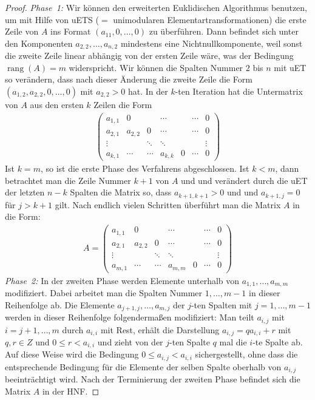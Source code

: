 \documentclass[
a4paper,12pt,
bibliography=totocnumbered,
numbers=noenddot,
]{scrartcl}
\numberwithin{equation}{subsection}
\newcommand{\rang}{\operatorname{rang}} %
\theoremstyle{plain}
\theoremstyle{definition}
\begin{document}
\begin{proof}
	\emph{Phase~1:} Wir können den erweiterten Euklidischen Algorithmus benutzen, um mit Hilfe von uETS ($=$ unimodularen Elementartransformationen) die erste Zeile von $A$ ins Format $(a_{11}, 0,\ldots, 0)$ zu überführen. 
	Dann befindet sich unter den Komponenten $a_{2,2},\ldots,a_{n,2}$ mindestens eine Nichtnullkomponente, weil sonst die zweite Zeile linear abhängig von der ersten Zeile wäre, was der Bedingung $\rang(A) = m$ widerspricht. Wir können die Spalten Nummer $2$ bis $n$ mit uET so verändern, dass nach dieser Änderung die zweite Zeile die Form $(a_{1,2},a_{2,2},0,\ldots,0)$ mit $a_{2,2}  >0$ hat. In der $k$-ten Iteration hat die Untermatrix von  $A$ aus den ersten $k$  Zeilen die Form 
	\begin{align*}
			\begin{pmatrix*}
					a_{1,1} & 0 &   & \cdots & & \cdots & 0 
\\					a_{2,1} & a_{2,2} & 0 & \cdots & & \cdots & 0 
\\ \vdots  & & \ddots & \ddots &  & & \vdots 
\\ a_{k,1} & \cdots & \cdots & a_{k,k} &  0 & \cdots & 0 
			\end{pmatrix*} 
	\end{align*} 
	Ist $k=m$, so ist die erste Phase des Verfahrens abgeschlossen. Ist $k<m$, dann betrachtet man die Zeile Nummer $k+1$ von $A$ und und verändert durch die uET der letzten $n-k$ Spalten die Matrix so, dass $a_{k+1,k+1}>0$ und und $a_{k+1,j} =0$ für $j> k+1$ gilt. Nach endlich vielen Schritten überführt man die Matrix $A$ in die Form: 
	\begin{align*}
		A=
	\begin{pmatrix*}
		a_{1,1} & 0 &   & \cdots & & \cdots & 0 
		\\					a_{2,1} & a_{2,2} & 0 & \cdots & & \cdots & 0 
		\\ \vdots  & & \ddots & \ddots &  & & \vdots 
		\\ a_{m,1} & \cdots & \cdots & a_{m,m} &  0 & \cdots & 0 
	\end{pmatrix*} 
\end{align*} 
	\emph{Phase~2:} In der zweiten Phase werden Elemente unterhalb von $a_{1,1},\ldots, a_{m,m}$ modifiziert. Dabei  arbeitet man die Spalten Nummer $1,\ldots,m-1$ in dieser Reihenfolge ab. Die Elemente $a_{j+1,j},\ldots, a_{m,j}$ der $j$-ten Spalten mit $j=1,\ldots, m-1$ werden in dieser Reihenfolge folgendermaßen modifiziert: Man teilt $a_{i,j}$ mit $i=j+1,\ldots,m$ durch $a_{i,i}$ mit Rest, erhält die Darstellung $a_{i,j} = q a_{i,i} + r$ mit $q,r \in Z$ und $0 \le r < a_{i,i}$ und zieht von der $j$-ten Spalte $q$ mal die $i$-te Spalte ab. Auf diese Weise wird die Bedingung $0 \le a_{i,j} < a_{i,i}$ sichergestellt, ohne dass die entsprechende Bedingung für die Elemente der selben Spalte oberhalb von $a_{i,j}$ beeinträchtigt wird. Nach der Terminierung der zweiten Phase befindet sich die Matrix $A$ in der HNF. 
	

\end{proof}
\end{document}
